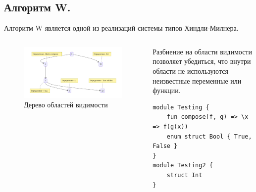\subsection{Алгоритм W.}

\begin{frame}[fragile]
    Алгоритм W является одной из реализаций системы типов Хиндли-Милнера.

    \begin{columns}
        \begin{column}{0.6\textwidth}
            \begin{figure}
                \centering
                \includegraphics[width=\textwidth]{figures/scopes}
                \caption{Дерево областей видимости}
                \label{fig:scopes}
            \end{figure}
        \end{column}
        \begin{column}{0.4\textwidth}
            Разбиение на области видимости позволяет убедиться, что внутри области не используются неизвестные переменные или функции.

            \small{
            \begin{lstlisting}[label=lst:kodept, caption={Исходная программа на языке Kodept}]
module Testing {
    fun compose(f, g) => \x => f(g(x))
    enum struct Bool { True, False }
}
module Testing2 {
    struct Int
}
            \end{lstlisting}}
        \end{column}
    \end{columns}
\end{frame}
